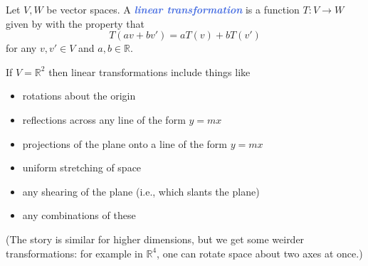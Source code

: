 \documentclass[10pt]{article}
\newcommand{\demph}[1]{\textcolor{RoyalBlue}{\textbf{\slshape #1}}} %
\theoremstyle{definition}
\newcommand{\R}{\mathbb{R}}           %
\begin{document}
Let $V,W$ be vector spaces. A \demph{linear transformation} is a function
$T:V \to W$ given by with the property that
\begin{equation*}
  T(av+bv')=aT(v)+bT(v')
\end{equation*}
for any $v,v'\in V$ and $a,b\in \R$.

If $V=\R^{2}$ then linear transformations include things like
\begin{itemize}
  \item rotations about the origin
  \item reflections across any line of the form $y=mx$
  \item projections of the plane onto a line of the form $y=mx$
  \item uniform stretching of space
  \item any shearing of the plane (i.e., which slants the plane)
  \item any combinations of these
\end{itemize}
(The story is similar for higher dimensions, but we get some weirder
transformations: for example in $\R^{4}$, one can rotate space about two axes
at once.)
\end{document}
